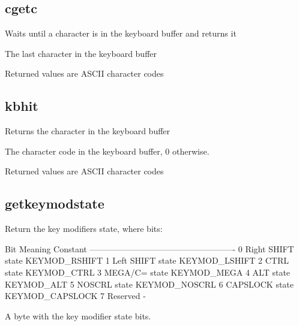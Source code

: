\subsection{cgetc}
\begin{description}[leftmargin=2cm,style=nextline]
\item [Description:] { Waits until a character is in the keyboard buffer and returns it }
\item [Syntax:] 
\item [Desription:] {The last character in the keyboard buffer }
\item [Notes:] {Returned values are ASCII character codes}
\end{description}

\subsection{kbhit}
\begin{description}[leftmargin=2cm,style=nextline]
\item [Description:] { Returns the character in the keyboard buffer }
\item [Syntax:] 
\item [Desription:] {The character code in the keyboard buffer,  0 otherwise. }
\item [Notes:] {Returned values are ASCII character codes}
\end{description}

\subsection{getkeymodstate}
\begin{description}[leftmargin=2cm,style=nextline]
\item [Description:] {
   Return the key modifiers state, where bits:

    Bit           Meaning             Constant
    ----------------------------------------------------
    0             Right SHIFT state   KEYMOD\_RSHIFT
    1             Left  SHIFT state   KEYMOD\_LSHIFT
    2             CTRL state          KEYMOD\_CTRL
    3             MEGA/C= state       KEYMOD\_MEGA
    4             ALT state           KEYMOD\_ALT
    5             NOSCRL state        KEYMOD\_NOSCRL
    6             CAPSLOCK state      KEYMOD\_CAPSLOCK
    7             Reserved            -
    }
\item [Syntax:] 
\item [Desription:] {A byte with the key modifier state bits.}
\end{description}


